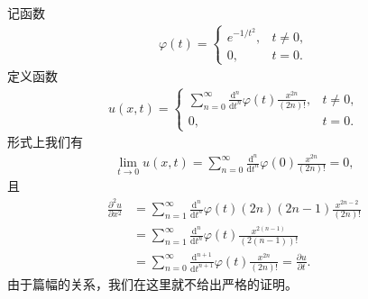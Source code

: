 \documentclass[../../main.tex]{subfiles}%
\begin{document}
\begin{remark}
记函数
\begin{align*}
\varphi(t)=\begin{cases}
e^{-1/t^2}, & t\neq 0,\\
0, & t=0.
\end{cases}
\end{align*}
定义函数
\begin{align*}
u(x,t)=\begin{cases}
\sum_{n=0}^{\infty}\frac{\mathrm{d}^n}{\mathrm{d}t^n}\varphi(t)\frac{x^{2n}}{(2n)!}, & t\neq 0,\\
0, & t=0.
\end{cases}
\end{align*}
形式上我们有
\begin{align*}
\lim_{t\to 0}u(x,t)=\sum_{n=0}^{\infty}\frac{\mathrm{d}^n}{\mathrm{d}t^n}\varphi(0)\frac{x^{2n}}{(2n)!}=0,
\end{align*}
且
\begin{align*}
\frac{\partial^2 u}{\partial x^2}
&=\sum_{n=1}^{\infty}\frac{\mathrm{d}^n}{\mathrm{d}t^n}\varphi(t)(2n)(2n-1)\frac{x^{2n-2}}{(2n)!} \\
&=\sum_{n=1}^{\infty}\frac{\mathrm{d}^n}{\mathrm{d}t^n}\varphi(t)\frac{x^{2(n-1)}}{(2(n-1))!} \\
&=\sum_{n=0}^{\infty}\frac{\mathrm{d}^{n+1}}{\mathrm{d}t^{n+1}}\varphi(t)\frac{x^{2n}}{(2n)!}=\frac{\partial u}{\partial t}.
\end{align*}
由于篇幅的关系，我们在这里就不给出严格的证明。
\end{remark}
\end{document}
